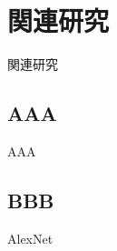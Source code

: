 \chapter{関連研究}
\label{related_works}

関連研究

\section{AAA}

AAA \cite{japanese}

\section{BBB}

AlexNet \cite{krizhevsky2012imagenet}
